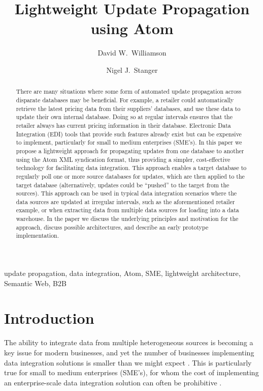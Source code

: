 \documentclass{CRPITStyle}
\title{Lightweight Update Propagation using Atom}
\author{David W.\ Williamson \and Nigel J.\ Stanger}
\affiliation{Department of Information Science, \\
	University of Otago, \\
	PO Box 56, Dunedin, New Zealand \\
	Email:~\texttt{\{dwilliamson,nstanger\}@infoscience.otago.ac.nz}}
\begin{document}
\maketitle


\begin{abstract}
There are many situations where some form of automated update
propagation across disparate databases may be beneficial. For example, a
retailer could automatically retrieve the latest pricing data from their
suppliers' databases, and use these data to update their own internal
database. Doing so at regular intervals ensures that the retailer always
has current pricing information in their database. Electronic Data
Integration (EDI) tools that provide such features already exist but can
be expensive to implement, particularly for small to medium enterprises
(SME's). In this paper we propose a lightweight approach for propagating
updates from one database to another using the Atom XML syndication
format, thus providing a simpler, cost-effective technology for
facilitating data integration. This approach enables a target database
to regularly poll one or more source databases for updates, which are
then applied to the target database (alternatively, updates could be
``pushed'' to the target from the sources). This approach can be used in
typical data integration scenarios where the data sources are updated at
irregular intervals, such as the aforementioned retailer example, or
when extracting data from multiple data sources for loading into a data
warehouse. In the paper we discuss the underlying principles and
motivation for the approach, discuss possible architectures, and
describe an early prototype implementation.
\end{abstract}
\vspace{.1in}

 update propagation, data integration, Atom,
SME, lightweight architecture, Semantic Web, B2B


\section{Introduction}
\label{sec-intro}

The ability to integrate data from multiple heterogeneous sources is
becoming a key issue for modern businesses, and yet the number of
businesses implementing data integration solutions is smaller than we
might expect \cite{Beck-R-2002-Bled,vaHe-E-1999-EDI}. This is
particularly true for small to medium enterprises (SME's), for whom the
cost of implementing an enterprise-scale data integration solution can
often be prohibitive
\cite{Beck-R-2002-Bled,Guo-J-2003-DocEng,Somm-RA-2002-SIGMOD}.
\end{document}
